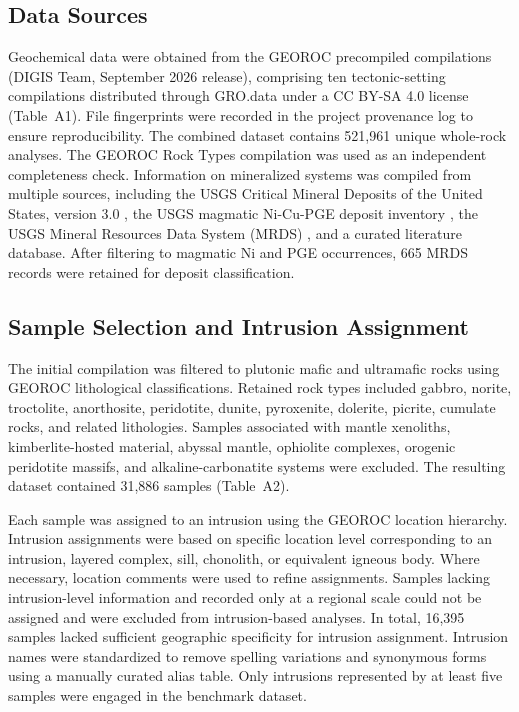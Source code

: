 \documentclass[10pt,twocolumn,letterpaper]{article}
\begin{document}
\subsection{Data Sources}
Geochemical data were obtained from the GEOROC precompiled compilations \cite{digis2026} (DIGIS Team, September 2026 release), comprising ten tectonic-setting compilations distributed through GRO.data under a CC BY-SA 4.0 license (Table~A1). File fingerprints were recorded in the project provenance log to ensure reproducibility. The combined dataset contains 521,961 unique whole-rock analyses. The GEOROC Rock Types compilation was used as an independent completeness check. Information on mineralized systems was compiled from multiple sources, including the USGS Critical Mineral Deposits of the United States, version 3.0 \cite{hammarstrom2023}, the USGS magmatic Ni-Cu-PGE deposit inventory \cite{parks2026}, the USGS Mineral Resources Data System (MRDS) \cite{usgs2005}, and a curated literature database. After filtering to magmatic Ni and PGE occurrences, 665 MRDS records were retained for deposit classification.

\subsection{Sample Selection and Intrusion Assignment}
The initial compilation was filtered to plutonic mafic and ultramafic rocks using GEOROC lithological classifications. Retained rock types included gabbro, norite, troctolite, anorthosite, peridotite, dunite, pyroxenite, dolerite, picrite, cumulate rocks, and related lithologies. Samples associated with mantle xenoliths, kimberlite-hosted material, abyssal mantle, ophiolite complexes, orogenic peridotite massifs, and alkaline-carbonatite systems were excluded. The resulting dataset contained 31,886 samples (Table~A2).

Each sample was assigned to an intrusion using the GEOROC location hierarchy. Intrusion assignments were based on specific location level corresponding to an intrusion, layered complex, sill, chonolith, or equivalent igneous body. Where necessary, location comments were used to refine assignments. Samples lacking intrusion-level information and recorded only at a regional scale could not be assigned and were excluded from intrusion-based analyses. In total, 16,395 samples lacked sufficient geographic specificity for intrusion assignment. Intrusion names were standardized to remove spelling variations and synonymous forms using a manually curated alias table. Only intrusions represented by at least five samples were engaged in the benchmark dataset.
\end{document}
